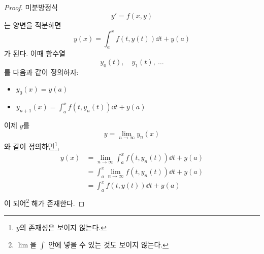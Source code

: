 \documentclass[../engineering_mathematics_lecture_note.tex]{subfiles}
\begin{document}
\begin{proof}
    미분방정식
    \begin{equation*}
        y' = f(x, y)
    \end{equation*}
    는 양변을 적분하면
    \begin{equation*}
        y(x) = \int_a^x{f(t, y(t)) \dd{t}} + y(a)
    \end{equation*}
    가 된다.
    이때 함수열
    \begin{equation*}
        y_0(t),\quad y_1(t),\ \dots
    \end{equation*}
    를 다음과 같이 정의하자:
    \begin{itemize}
        \item $y_0(x) = y(a)$
        \item $y_{n + 1}(x) = \int_a^x{f(t, y_n(t)) \dd{t}} + y(a)$
    \end{itemize}
    이제 $y$를
    \begin{equation*}
        y = \lim_{n \rightarrow \infty} y_n(x)
    \end{equation*}
    와 같이 정의하면\footnote{$y$의 존재성은 보이지 않는다.},
    \begin{align*}
        y(x) &= \lim_{n \rightarrow \infty} \int_a^x{f(t, y_n(t)) \dd{t}} + y(a)\\
             &= \int_a^x{\lim_{n \rightarrow \infty} f(t, y_n(t)) \dd{t}} + y(a)\\
             &= \int_a^x{f(t, y(t)) \dd{t}} + y(a)\\
    \end{align*}
    이 되어\footnote{$\lim$을 $\int$ 안에 넣을 수 있는 것도 보이지 않는다.} 해가 존재한다.
\end{proof}
\end{document}
